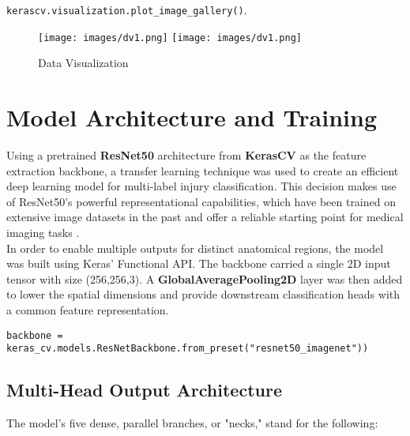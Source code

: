 \documentclass[a4paper,12pt]{article}
\begin{document}
\verb|kerascv.visualization.plot_image_gallery()|\cite{kerascv2024augmentation}.

\begin{figure}[!htbp]
    \centering
    \texttt{[image: images/dv1.png]}
    \texttt{[image: images/dv1.png]}
    \caption{Data Visualization}
    \label{fig:dv_meth}
\end{figure}


\section{Model Architecture and Training}
Using a pretrained \textbf{ResNet50} architecture from \textbf{KerasCV} as the feature extraction backbone, a transfer learning technique was used to create an efficient deep learning model for multi-label injury classification. This decision makes use of ResNet50's powerful representational capabilities, which have been trained on extensive image datasets in the past and offer a reliable starting point for medical imaging tasks \cite{he2016deep}.\\


In order to enable multiple outputs for distinct anatomical regions, the model was built using Keras' Functional API. The backbone carried a single 2D input tensor with size (256,256,3). A \textbf{GlobalAveragePooling2D} layer was then added to lower the spatial dimensions and provide downstream classification heads with a common feature representation.


\verb|backbone = keras_cv.models.ResNetBackbone.from_preset("resnet50_imagenet"))|


\subsection{Multi-Head Output Architecture}
The model's five dense, parallel branches, or "necks," stand for the following: 
\end{document}
